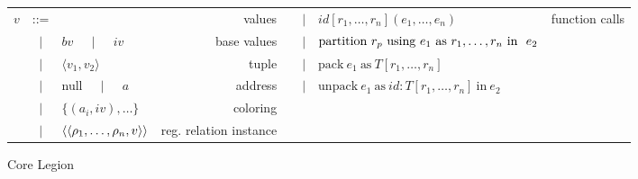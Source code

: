 \begin{figure*}
{\begin{tabular}{cclr|cclr}
$v$ & ::= & & values &   
       & $\mid$& $id[r_1, \ldots, r_n](e_1,\ldots,e_n)$ & function calls \\
  &$\mid$& $bv$ $\;\;\;\mid\;\;\;$ $iv$ & base values &   
       & $\mid$ & $\text{partition}\ r_p\text{ using }e_1\text{ as }{r}_1,\ldots,{r}_n\text{ in }\ e_2$ &  \\
  &$\mid$& $\langle v_1, v_2 \rangle$ & tuple & 
       & $\mid$& $\text{pack}\ e_1\ \text{as}\ T[r_1,\ldots,r_n]$ &  \\
  &$\mid$& null $\;\;\;\mid\;\;\;$ $a$ & address & 
       & $\mid$& $\text{unpack}\ e_1\ \text{as}\ id : T[r_1,\ldots,r_n]\ \text{in}\ e_2$ &  \\
  &$\mid$& $\{ (a_i, iv), \ldots \}$ & coloring & 
    & & & \\
  &$\mid$& $\langle \langle {\rho}_1,\ldots,{\rho}_n, v\rangle \rangle$ & reg. relation instance & 
   & & & \\
\end{tabular}
}
\caption{Core Legion}
\label{fig:langdef}
\vspace{-5mm}
\end{figure*}

